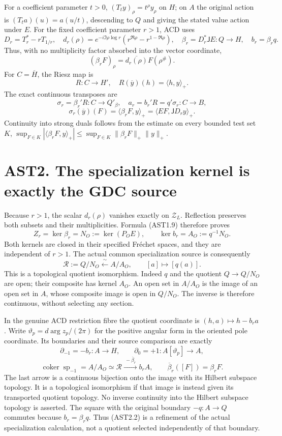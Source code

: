 For a coefficient parameter \(t>0\), \((T_ty)_\rho=t^\rho y_\rho\) on
\(H\); on \(A\) the original action is \((T_ta)(u)=a(u/t)\), descending
to \(Q\) and giving the stated value action under \(E\). For the fixed
coefficient parameter \(r>1\), ACD uses \[
D_r=T_r^*-rT_{1/r},\quad
d_r(\rho)=e^{-i\Im\rho\log r}
(r^{\Re\rho}-r^{1-\Re\rho}),\quad
\beta_r=D_r^*\mathsf JE:Q\to H,\quad b_r=\beta_rq.
\tag{AST1.8}
\] Thus, with no multiplicity factor absorbed into the vector
coordinate, \[
(\beta_rF)_\rho=\overline{d_r(\rho)}F(\rho^\#).
\tag{AST1.9}
\] For \(C=\overline H\), the Riesz map is \[
R:C\to H',\quad R(\overline y)(h)=\langle h,y\rangle_+.
\] The exact continuous transposes are \[
\sigma_r=\beta_r'R:C\to Q'_\beta,\quad
a_r=b_r'R=q'\sigma_r:C\to B,
\] \[
\sigma_r(\overline y)(F)=\langle\beta_rF,y\rangle_+
=\langle EF,\mathsf JD_ry\rangle_+.
\tag{AST1.10}
\] Continuity into strong duals follows from the estimate on every
bounded test set \(K\), \(\sup_{F\in K}|\langle\beta_rF,y\rangle_+|
\le\sup_{F\in K}\|\beta_rF\|_+\|y\|_+\).

\section{AST2. The specialization kernel is exactly the GDC
source}\label{ast2.-the-specialization-kernel-is-exactly-the-gdc-source}

Because \(r>1\), the scalar \(d_r(\rho)\) vanishes exactly on
\(\mathscr Z_L\). Reflection preserves both subsets and their
multiplicities. Formula (AST1.9) therefore proves \[
\boxed{Z_r=\ker\beta_r=N_O:=\ker(P_OE),\qquad
\ker b_r=A_O:=q^{-1}N_O.}
\tag{AST2.1}
\] Both kernels are closed in their specified Fréchet spaces, and they
are independent of \(r>1\). The actual common specialization source is
consequently \[
\mathcal R:=Q/N_O\xleftarrow{\ \sim\ }A/A_O,
\qquad [a]\longmapsto[q(a)].
\tag{AST2.2}
\] This is a topological quotient isomorphism. Indeed \(q\) and the
quotient \(Q\to Q/N_O\) are open; their composite has kernel \(A_O\). An
open set in \(A/A_O\) is the image of an open set in \(A\), whose
composite image is open in \(Q/N_O\). The inverse is therefore
continuous, without selecting any section.

In the genuine ACD restriction fibre the quotient coordinate is
\((h,a)\mapsto h-b_ra\). Write \(\vartheta_p=d\arg z_p/(2\pi)\) for the
positive angular form in the oriented pole coordinate. Its boundaries
and their source comparison are exactly \[
\partial_{-1}=-b_r:A\to H,\qquad
\partial_0=+1:A[\vartheta_p]\to A,
\] \[
\operatorname{coker}\operatorname{sp}_{-1}
=A/A_O\simeq\mathcal R
\xrightarrow{\ -\overline\beta_r\ }b_rA,\qquad
\overline\beta_r([F])=\beta_rF.
\tag{AST2.3}
\] The last arrow is a continuous bijection onto the image with its
Hilbert subspace topology. It is a topological isomorphism if that image
is instead given its transported quotient topology. No inverse
continuity into the Hilbert subspace topology is asserted. The square
with the original boundary \(-q:A\to Q\) commutes because
\(b_r=\beta_rq\). Thus (AST2.2) is a refinement of the actual
specialization calculation, not a quotient selected independently of
that boundary.

